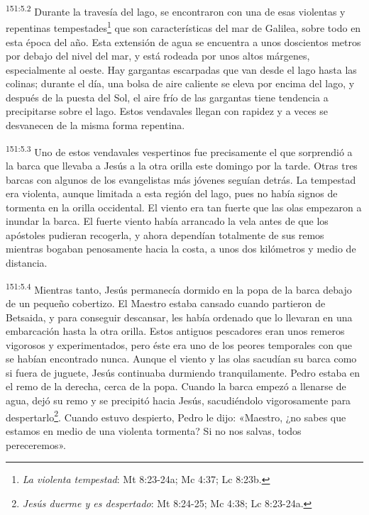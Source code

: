 \par
\textsuperscript{151:5.2} Durante la travesía del lago, se encontraron con una de esas violentas y repentinas tempestades\footnote{\textit{La violenta tempestad}: Mt 8:23-24a; Mc 4:37; Lc 8:23b.} que son características del mar de Galilea, sobre todo en esta época del año. Esta extensión de agua se encuentra a unos doscientos metros por debajo del nivel del mar, y está rodeada por unos altos márgenes, especialmente al oeste. Hay gargantas escarpadas que van desde el lago hasta las colinas; durante el día, una bolsa de aire caliente se eleva por encima del lago, y después de la puesta del Sol, el aire frío de las gargantas tiene tendencia a precipitarse sobre el lago. Estos vendavales llegan con rapidez y a veces se desvanecen de la misma forma repentina.

\par
\textsuperscript{151:5.3} Uno de estos vendavales vespertinos fue precisamente el que sorprendió a la barca que llevaba a Jesús a la otra orilla este domingo por la tarde. Otras tres barcas con algunos de los evangelistas más jóvenes seguían detrás. La tempestad era violenta, aunque limitada a esta región del lago, pues no había signos de tormenta en la orilla occidental. El viento era tan fuerte que las olas empezaron a inundar la barca. El fuerte viento había arrancado la vela antes de que los apóstoles pudieran recogerla, y ahora dependían totalmente de sus remos mientras bogaban penosamente hacia la costa, a unos dos kilómetros y medio de distancia.

\par
\textsuperscript{151:5.4} Mientras tanto, Jesús permanecía dormido en la popa de la barca debajo de un pequeño cobertizo. El Maestro estaba cansado cuando partieron de Betsaida, y para conseguir descansar, les había ordenado que lo llevaran en una embarcación hasta la otra orilla. Estos antiguos pescadores eran unos remeros vigorosos y experimentados, pero éste era uno de los peores temporales con que se habían encontrado nunca. Aunque el viento y las olas sacudían su barca como si fuera de juguete, Jesús continuaba durmiendo tranquilamente. Pedro estaba en el remo de la derecha, cerca de la popa. Cuando la barca empezó a llenarse de agua, dejó su remo y se precipitó hacia Jesús, sacudiéndolo vigorosamente para despertarlo\footnote{\textit{Jesús duerme y es despertado}: Mt 8:24-25; Mc 4:38; Lc 8:23-24a.}. Cuando estuvo despierto, Pedro le dijo: «Maestro, ¿no sabes que estamos en medio de una violenta tormenta? Si no nos salvas, todos pereceremos».

